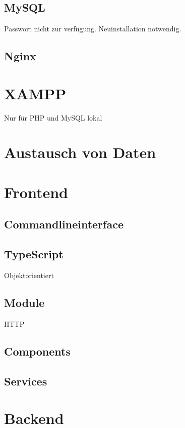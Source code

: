 \subsection{MySQL}
Passwort nicht zur verfügung. Neuinstallation notwendig.

\subsection{Nginx}

\section{XAMPP}
Nur für PHP und MySQL lokal 

\section{Austausch von Daten}




\section{Frontend}

\subsection{Commandlineinterface}

\subsection{TypeScript}
Objektorientiert

\subsection{Module}
HTTP

\subsection{Components}

\subsection{Services}





\section{Backend}

